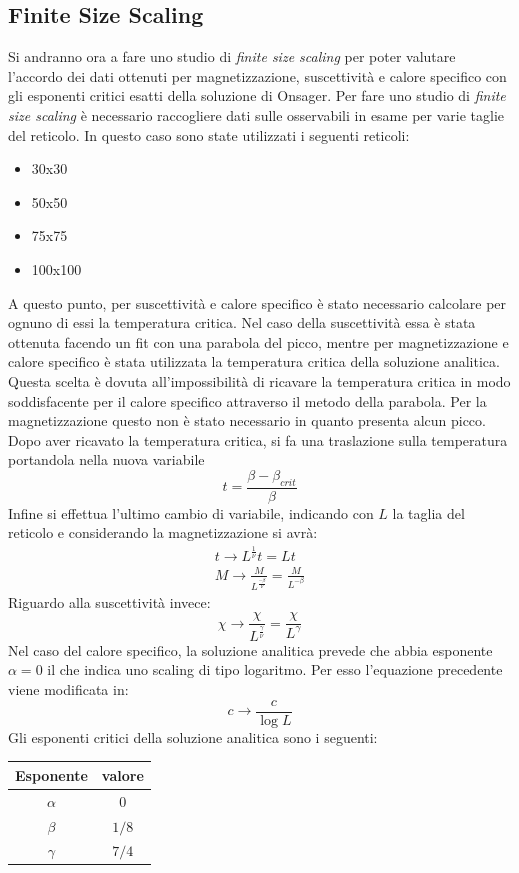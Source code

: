 \subsection{Finite Size Scaling}
Si andranno ora a fare uno studio di \emph{finite size scaling} per poter valutare l'accordo dei dati ottenuti per magnetizzazione, suscettività e calore specifico con gli esponenti critici esatti della soluzione di Onsager.
Per fare uno studio di \emph{finite size scaling} è necessario raccogliere dati sulle osservabili in esame per varie taglie del reticolo. In questo caso sono state utilizzati i seguenti reticoli:
\begin{itemize}
\item 30x30 
\item 50x50 
\item 75x75 
\item 100x100 
\end{itemize}
A questo punto, per suscettività e calore specifico è stato necessario calcolare per ognuno di essi la temperatura critica.
Nel caso della suscettività essa è stata ottenuta facendo un fit con una parabola del picco, mentre per magnetizzazione e calore specifico è stata utilizzata la temperatura critica della soluzione analitica.
Questa scelta è dovuta all'impossibilità di ricavare la temperatura critica in modo soddisfacente per il calore specifico attraverso il metodo della parabola.
Per la magnetizzazione questo non è stato necessario in quanto presenta alcun picco.\\
Dopo aver ricavato la temperatura critica, si fa una traslazione sulla temperatura portandola nella nuova variabile 
$$
	 t = \frac{\beta - \beta_{crit}}{\beta}
$$ 
Infine si effettua l'ultimo cambio di variabile, indicando con $L$ la taglia del reticolo e considerando la magnetizzazione si avrà:
\begin{align}
	t \longrightarrow L^{\frac{1}{\nu}} t = L t \\
	M \longrightarrow \frac{M}{L^{\frac{-\beta}{\nu}}} = \frac{M}{L^{-\beta}}
\end{align}
Riguardo alla suscettività invece:
$$
	\chi \longrightarrow \frac{\chi}{L^{\frac{\gamma}{\nu}}} = \frac{\chi}{L^{\gamma}}
$$
Nel caso del calore specifico, la soluzione analitica prevede che abbia esponente $\alpha=0$ il che indica uno scaling di tipo logaritmo. Per esso l'equazione precedente viene modificata in:
$$
	c \longrightarrow \frac{c}{\log{L}}
$$
Gli esponenti critici della soluzione analitica sono i seguenti:
\begin{center}
	\begin{tabular}{|c|c|}
		\toprule
		Esponente & valore \\
		\midrule
		$\alpha$ & 0 \\
		$\beta$ & $1/8$\\
		$\gamma$ & $7/4$ \\
		\bottomrule
	\end{tabular}
\end{center}

